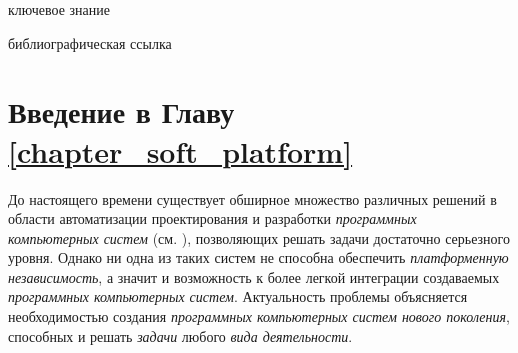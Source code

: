 \begin{SCn}
\begin{scnrelfromlist}{ключевое знание}
	\begin{scnindent}
	\end{scnindent}
\end{scnrelfromlist}

\begin{scnrelfromlist}{библиографическая ссылка}
\end{scnrelfromlist}

\end{SCn}

\section*{Введение в Главу \ref{chapter_soft_platform}}

До настоящего времени существует обширное множество различных решений в области автоматизации проектирования и разработки \textit{программных компьютерных систем} (см. ), позволяющих решать задачи достаточно серьезного уровня. Однако ни одна из таких систем не способна обеспечить \textit{платформенную независимость}, а значит и возможность к более легкой интеграции создаваемых \textit{программных компьютерных систем}. Актуальность проблемы объясняется необходимостью создания \textit{программных компьютерных систем нового поколения}, способных  и  решать \textit{задачи} любого \textit{вида деятельности}.

